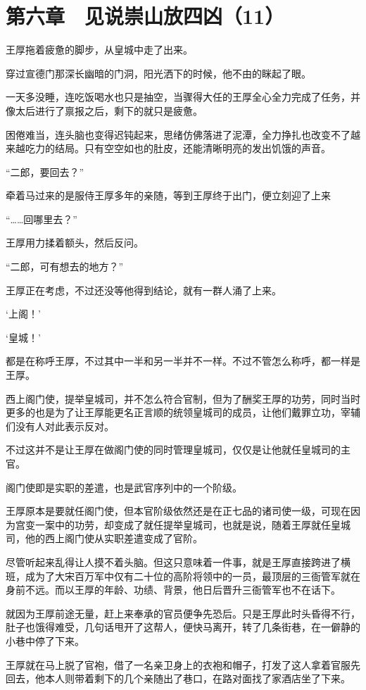 \section{第六章　见说崇山放四凶（11）}

王厚拖着疲惫的脚步，从皇城中走了出来。

穿过宣德门那深长幽暗的门洞，阳光洒下的时候，他不由的眯起了眼。

一天多没睡，连吃饭喝水也只是抽空，当骤得大任的王厚全心全力完成了任务，并像太后进行了禀报之后，剩下的就只是疲惫。

困倦难当，连头脑也变得迟钝起来，思绪仿佛落进了泥潭，全力挣扎也改变不了越来越吃力的结局。只有空空如也的肚皮，还能清晰明亮的发出饥饿的声音。

“二郎，要回去？”

牵着马过来的是服侍王厚多年的亲随，等到王厚终于出门，便立刻迎了上来

“……回哪里去？”

王厚用力揉着额头，然后反问。

“二郎，可有想去的地方？”

王厚正在考虑，不过还没等他得到结论，就有一群人涌了上来。

‘上阁！’

‘皇城！’

都是在称呼王厚，不过其中一半和另一半并不一样。不过不管怎么称呼，都一样是王厚。

西上阁门使，提举皇城司，并不怎么符合官制，但为了酬奖王厚的功劳，同时当时更多的也是为了让王厚能更名正言顺的统领皇城司的成员，让他们戴罪立功，宰辅们没有人对此表示反对。

不过这并不是让王厚在做阁门使的同时管理皇城司，仅仅是让他就任皇城司的主官。

阁门使即是实职的差遣，也是武官序列中的一个阶级。

王厚原本是要就任阁门使，但本官阶级依然还是在正七品的诸司使一级，可现在因为宫变一案中的功劳，却变成了就任提举皇城司，也就是说，随着王厚就任皇城司，他的西上阁门使从实职差遣变成了官阶。

尽管听起来乱得让人摸不着头脑。但这只意味着一件事，就是王厚直接跨进了横班，成为了大宋百万军中仅有二十位的高阶将领中的一员，最顶层的三衙管军就在身前不远。而以王厚的年龄、功绩、背景，他日后晋升三衙管军也不在话下。

就因为王厚前途无量，赶上来奉承的官员便争先恐后。只是王厚此时头昏得不行，肚子也饿得难受，几句话甩开了这帮人，便快马离开，转了几条街巷，在一僻静的小巷中停了下来。

王厚就在马上脱了官袍，借了一名亲卫身上的衣袍和帽子，打发了这人拿着官服先回去，他本人则带着剩下的几个亲随出了巷口，在路对面找了家酒店坐了下来。

